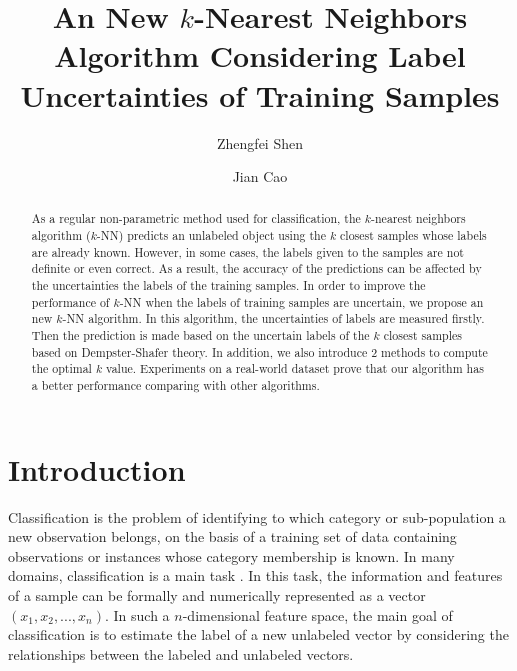 \documentclass[runningheads]{llncs}
\begin{document}
%
\title{An New $k$-Nearest Neighbors Algorithm Considering Label Uncertainties of Training Samples}
%
%
\author{Zhengfei Shen \and
Jian Cao }
%
%
%
\maketitle              %
%
\begin{abstract}
As a regular non-parametric method used for classification, the $k$-nearest neighbors algorithm ($k$-NN) predicts an unlabeled object using the $k$ closest samples whose labels are already known. However, in some cases, the labels given to the samples are not definite or even correct. As a result, the accuracy of the predictions can be affected by the uncertainties the labels of the training samples. In order to improve the performance of $k$-NN when the labels of training samples are uncertain, we propose an new $k$-NN algorithm. In this algorithm, the uncertainties of labels are measured firstly. Then the prediction is made based on the uncertain labels of the $k$ closest samples based on Dempster-Shafer theory. In addition, we also introduce 2 methods to compute the optimal $k$ value. Experiments on a real-world dataset prove that our algorithm has a better performance comparing with other algorithms. 

\end{abstract}
%
%
%
\section{Introduction}
Classification is the problem of identifying to which category or sub-population a new observation belongs, on the basis of a training set of data containing observations or instances whose category membership is known. In many domains, classification is a main task \cite{ref_article1}. In this task, the information and features of a sample can be formally and numerically represented as a vector $(x_1,x_2,...,x_n)$. In such a $n$-dimensional feature space, the main goal of classification is to estimate the label of a new unlabeled vector by considering the relationships between the labeled and unlabeled vectors. 
\end{document}
